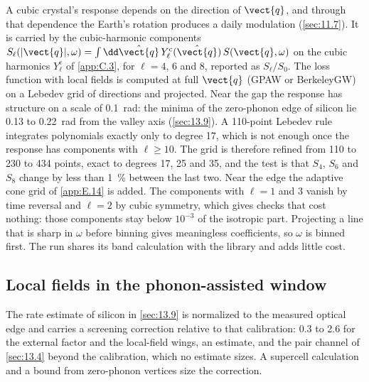 A cubic crystal's response depends on the direction of $\vect{q}$, and through that dependence the Earth's rotation produces a daily modulation (\cref{sec:11.7}). It is carried by the cubic-harmonic components $S_\ell(|\vect{q}|,\omega) = \int\dd\hat{\vect{q}}\,Y^{\mathrm{c}}_\ell(\hat{\vect{q}})\,S(\vect{q},\omega)$ on the cubic harmonics $Y^{\mathrm{c}}_\ell$ of \cref{app:C.3}, for $\ell = 4$, 6 and 8, reported as $S_\ell/S_0$. The loss function with local fields is computed at full $\vect{q}$ (GPAW or BerkeleyGW) on a Lebedev grid of directions and projected. Near the gap the response has structure on a scale of \SI{0.1}{rad}: the minima of the zero-phonon edge of silicon lie 0.13 to \SI{0.22}{rad} from the valley axis (\cref{sec:13.9}). A 110-point Lebedev rule integrates polynomials exactly only to degree 17, which is not enough once the response has components with $\ell \ge 10$. The grid is therefore refined from 110 to 230 to 434 points, exact to degrees 17, 25 and 35, and the test is that $S_4$, $S_6$ and $S_8$ change by less than \SI{1}{\percent} between the last two. Near the edge the adaptive cone grid of \cref{app:E.14} is added. The components with $\ell = 1$ and 3 vanish by time reversal and $\ell = 2$ by cubic symmetry, which gives checks that cost nothing: those components stay below $10^{-3}$ of the isotropic part. Projecting a line that is sharp in $\omega$ before binning gives meaningless coefficients, so $\omega$ is binned first. The run shares its band calculation with the library and adds little cost.

\subsection{Local fields in the phonon-assisted window}

The rate estimate of silicon in \cref{sec:13.9} is normalized to the measured optical edge and carries a screening correction relative to that calibration: 0.3 to 2.6 for the external factor and the local-field wings, an estimate, and the pair channel of \cref{sec:13.4} beyond the calibration, which no estimate sizes. A supercell calculation and a bound from zero-phonon vertices size the correction.

